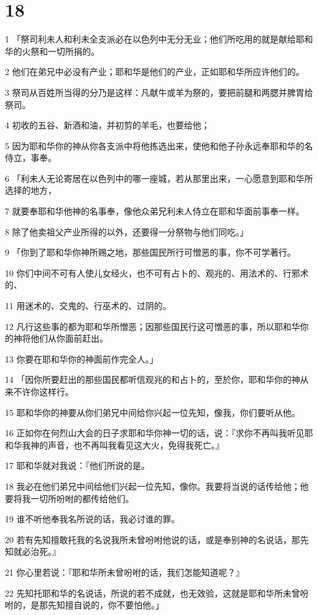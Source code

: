 \chapter{18}

\par 1 「祭司利未人和利未全支派必在以色列中无分无业；他们所吃用的就是献给耶和华的火祭和一切所捐的。
\par 2 他们在弟兄中必没有产业；耶和华是他们的产业，正如耶和华所应许他们的。
\par 3 祭司从百姓所当得的分乃是这样：凡献牛或羊为祭的，要把前腿和两腮并脾胃给祭司。
\par 4 初收的五谷、新酒和油，并初剪的羊毛，也要给他；
\par 5 因为耶和华你的神从你各支派中将他拣选出来，使他和他子孙永远奉耶和华的名侍立，事奉。
\par 6 「利未人无论寄居在以色列中的哪一座城，若从那里出来，一心愿意到耶和华所选择的地方，
\par 7 就要奉耶和华他神的名事奉，像他众弟兄利未人侍立在耶和华面前事奉一样。
\par 8 除了他卖祖父产业所得的以外，还要得一分祭物与他们同吃。」
\par 9 「你到了耶和华你神所赐之地，那些国民所行可憎恶的事，你不可学著行。
\par 10 你们中间不可有人使儿女经火，也不可有占卜的、观兆的、用法术的、行邪术的、
\par 11 用迷术的、交鬼的、行巫术的、过阴的。
\par 12 凡行这些事的都为耶和华所憎恶；因那些国民行这可憎恶的事，所以耶和华你的神将他们从你面前赶出。
\par 13 你要在耶和华你的神面前作完全人。」
\par 14 「因你所要赶出的那些国民都听信观兆的和占卜的，至於你，耶和华你的神从来不许你这样行。
\par 15 耶和华你的神要从你们弟兄中间给你兴起一位先知，像我，你们要听从他。
\par 16 正如你在何烈山大会的日子求耶和华你神一切的话，说：『求你不再叫我听见耶和华我神的声音，也不再叫我看见这大火，免得我死亡。』
\par 17 耶和华就对我说：『他们所说的是。
\par 18 我必在他们弟兄中间给他们兴起一位先知，像你。我要将当说的话传给他；他要将我一切所吩咐的都传给他们。
\par 19 谁不听他奉我名所说的话，我必讨谁的罪。
\par 20 若有先知擅敢托我的名说我所未曾吩咐他说的话，或是奉别神的名说话，那先知就必治死。』
\par 21 你心里若说：『耶和华所未曾吩咐的话，我们怎能知道呢？』
\par 22 先知托耶和华的名说话，所说的若不成就，也无效验，这就是耶和华所未曾吩咐的，是那先知擅自说的，你不要怕他。」

